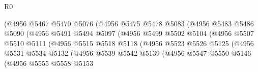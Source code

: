 \begin{lexlean}{R0}
\begin{coremodule}
                                    (@4956
                                      @5467
                                      @5470
                                      @5076
                                      (@4956
                                        @5475
                                        @5478
                                        @5083
                                        (@4956
                                          @5483
                                          @5486
                                          @5090
                                          (@4956
                                            @5491
                                            @5494
                                            @5097
                                            (@4956
                                              @5499
                                              @5502
                                              @5104
                                              (@4956
                                                @5507
                                                @5510
                                                @5111
                                                (@4956
                                                  @5515
                                                  @5518
                                                  @5118
                                                  (@4956
                                                    @5523
                                                    @5526
                                                    @5125
                                                    (@4956
                                                      @5531
                                                      @5534
                                                      @5132
                                                      (@4956
                                                        @5539
                                                        @5542
                                                        @5139
                                                        (@4956
                                                          @5547
                                                          @5550
                                                          @5146
                                                          (@4956
                                                            @5555
                                                            @5558
                                                            @5153

\end{coremodule}
\end{lexlean}
